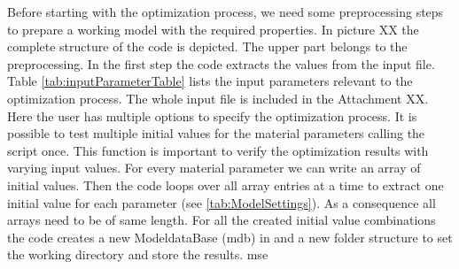     Before starting with the optimization process, we need some preprocessing steps to prepare a working  model with the required properties. In picture XX the complete structure of the code is depicted. The upper part belongs to the preprocessing. In the first step the code extracts the values from the input file. Table \autoref{tab:inputParameterTable} lists the input parameters relevant to the optimization process. The whole input file is included in the Attachment XX. Here the user has multiple options to specify the optimization process. It is possible to test multiple initial values for the material parameters calling the script once. This function is important to verify the optimization results with varying input values. For every material parameter we can write an array of initial values. Then the code loops over all array entries at a time to extract one initial value for each parameter (see \autoref{tab:ModelSettings}). As a consequence all arrays need to be of same length. For all the created initial value combinations the code creates a new ModeldataBase (mdb) in  and a new folder structure to set the working directory and store the results. \acrfull{mse}
    

